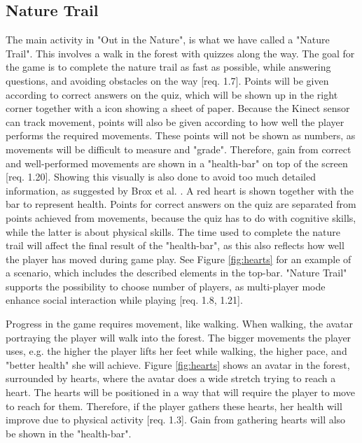 \subsection{Nature Trail}
The main activity in "Out in the Nature", is what we have called a "Nature Trail". This involves a walk in the forest with quizzes along the way. The goal for the game is to complete the nature trail as fast as possible, while answering questions, and avoiding obstacles on the way [req. 1.7]. Points will be given according to correct answers on the quiz, which will be shown up in the right corner together with a icon showing a sheet of paper. Because the Kinect sensor can track movement, points will also be given according to how well the player performs the required movements. These points will not be shown as numbers, as movements will be difficult to measure and "grade". Therefore, gain from correct and well-performed movements are shown in a "health-bar" on top of the screen [req. 1.20]. Showing this visually is also done to avoid too much detailed information, as suggested by Brox et al. \cite{exergamesforelderly}. A red heart is shown together with the bar to represent health. Points for correct answers on the quiz are separated from points achieved from movements, because the quiz has to do with cognitive skills, while the latter is about physical skills. The time used to complete the nature trail will affect the final result of the "health-bar", as this also reflects how well the player has moved during game play. See Figure \ref{fig:hearts} for an example of a scenario, which includes the described elements in the top-bar. "Nature Trail" supports the possibility to choose number of players, as multi-player mode enhance social interaction while playing [req. 1.8, 1.21].  

Progress in the game requires movement, like walking. When walking, the avatar portraying the player will walk into the forest. The bigger movements the player uses, e.g. the higher the player lifts her feet while walking, the higher pace, and "better health" she will achieve. Figure \ref{fig:hearts} shows an avatar in the forest, surrounded by hearts, where the avatar does a wide stretch trying to reach a heart. The hearts will be positioned in a way that will require the player to move to reach for them. Therefore, if the player gathers these hearts, her health will improve due to physical activity [req. 1.3]. Gain from gathering hearts will also be shown in the "health-bar".   

